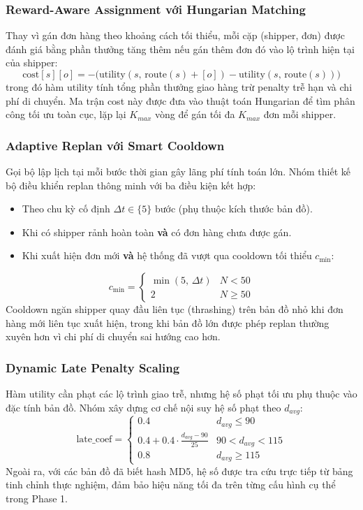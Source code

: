 \documentclass[conference]{IEEEtran}
\begin{document}
\subsubsection{Reward-Aware Assignment với Hungarian Matching}
Thay vì gán đơn hàng theo khoảng cách tối thiểu, mỗi cặp (shipper, đơn) được đánh giá bằng phần thưởng tăng thêm nếu gán thêm đơn đó vào lộ trình hiện tại của shipper:
\begin{equation}
\text{cost}[s][o] = -\bigl(\text{utility}(s,\, \text{route}(s) + [o]) - \text{utility}(s,\, \text{route}(s))\bigr)
\end{equation}
trong đó hàm utility tính tổng phần thưởng giao hàng trừ penalty trễ hạn và chi phí di chuyển. Ma trận cost này được đưa vào thuật toán Hungarian để tìm phân công tối ưu toàn cục, lặp lại $K_{max}$ vòng để gán tối đa $K_{max}$ đơn mỗi shipper.
 
\subsubsection{Adaptive Replan với Smart Cooldown}
Gọi bộ lập lịch tại mỗi bước thời gian gây lãng phí tính toán lớn. Nhóm thiết kế bộ điều khiển replan thông minh với ba điều kiện kết hợp:
\begin{itemize}
    \item Theo chu kỳ cố định $\Delta t \in \{5\}$ bước (phụ thuộc kích thước bản đồ).
    \item Khi có shipper rảnh hoàn toàn \textbf{và} có đơn hàng chưa được gán.
    \item Khi xuất hiện đơn mới \textbf{và} hệ thống đã vượt qua cooldown tối thiểu $c_{\min}$:
\end{itemize}
\begin{equation}
c_{\min} = \begin{cases} \min(5,\, \Delta t) & N < 50 \\ 2 & N \ge 50 \end{cases}
\end{equation}
Cooldown ngăn shipper quay đầu liên tục (thrashing) trên bản đồ nhỏ khi đơn hàng mới liên tục xuất hiện, trong khi bản đồ lớn được phép replan thường xuyên hơn vì chi phí di chuyển sai hướng cao hơn.
 
\subsubsection{Dynamic Late Penalty Scaling}
Hàm utility cần phạt các lộ trình giao trễ, nhưng hệ số phạt tối ưu phụ thuộc vào đặc tính bản đồ. Nhóm xây dựng cơ chế nội suy hệ số phạt theo $d_{avg}$:
\begin{equation}
\text{late\_coef} = \begin{cases} 0.4 & d_{avg} \le 90 \\ 0.4 + 0.4 \cdot \frac{d_{avg} - 90}{25} & 90 < d_{avg} < 115 \\ 0.8 & d_{avg} \ge 115 \end{cases}
\end{equation}
Ngoài ra, với các bản đồ đã biết hash MD5, hệ số được tra cứu trực tiếp từ bảng tinh chỉnh thực nghiệm, đảm bảo hiệu năng tối đa trên từng cấu hình cụ thể trong Phase 1.
 
\end{document}
